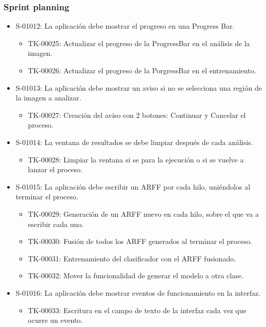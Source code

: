\subsubsection*{Sprint planning}
\begin{itemize}
 \item S-01012: La aplicación debe mostrar el progreso en una Progress Bar.
 \begin{itemize}
   \item TK-00025: Actualizar el progreso de la ProgressBar en el análisis de la imagen.
   \item TK-00026: Actualizar el progreso de la PorgressBar en el entrenamiento.
  \end{itemize}
 \item S-01013: La aplicación debe mostrar un aviso si no se selecciona una región de la imagen a analizar.
 \begin{itemize}
   \item TK-00027: Creación del aviso con 2 botones: Continuar y Cancelar el proceso.
  \end{itemize}
 \item S-01014: La ventana de resultados se debe limpiar después de cada análisis.
  \begin{itemize}
   \item TK-00028: Limpiar la ventana si se para la ejecución o si se vuelve a lanzar el proceso.
  \end{itemize}
 \item S-01015: La aplicación debe escribir un ARFF por cada hilo, uniéndolos al terminar el proceso.
  \begin{itemize}
   \item TK-00029: Generación de un ARFF nuevo en cada hilo, sobre el que va a escribir cada uno.
   \item TK-00030: Fusión de todos los ARFF generados al terminar el proceso.
   \item TK-00031: Entrenamiento del clasificador con el ARFF fusionado.
   \item TK-00032: Mover la funcionalidad de generar el modelo a otra clase.
  \end{itemize}
 \item S-01016: La aplicación debe mostrar eventos de funcionamiento en la interfaz.
  \begin{itemize}
   \item TK-00033: Escritura en el campo de texto de la interfaz cada vez que ocurre un evento.
  \end{itemize}

\end{itemize}
